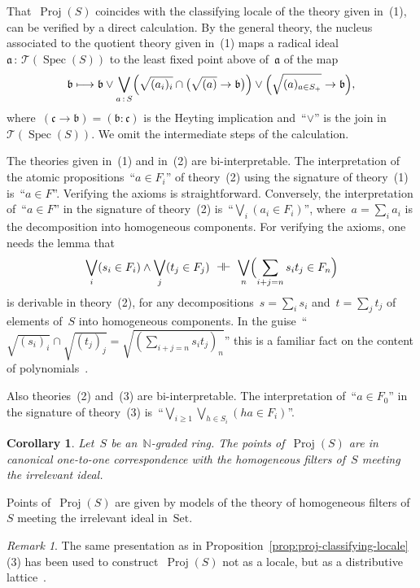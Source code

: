 \documentclass[10pt,reqno,a4paper]{amsbook}
\makeatletter
\theoremstyle{definition}
\theoremstyle{plain}
\newtheorem{cor}[defn]{Corollary}
\theoremstyle{remark}
\newtheorem{rem}[defn]{Remark}
\newcommand{\T}{\mathcal{T}}
\newcommand{\NN}{\mathbb{N}}
\newcommand{\aaa}{\mathfrak{a}}
\newcommand{\bbb}{\mathfrak{b}}
\newcommand{\ccc}{\mathfrak{c}}
\newcommand{\Set}{\mathrm{Set}}
\DeclareMathOperator{\Spec}{Spec}
\DeclareMathOperator{\Proj}{Proj}
\newcommand{\Open}{\T}
\newcommand{\?}{\,{:}\,}
\renewcommand{\_}{\mathpunct{.}\,}
\renewenvironment{proof}[1][\proofname]{\par
  \pushQED{\qed}%
  \normalfont \topsep6\p@\@plus6\p@\relax
  \trivlist
  \item[\hskip\labelsep
        \itshape
    #1\@addpunct{.}]\ignorespaces
}{%
  \popQED\endtrivlist\@endpefalse
}
\makeatother
\begin{document}
\begin{proof}That~$\Proj(S)$ coincides with the classifying locale of the
theory given in~(1), can be verified by a direct calculation. By the general
theory, the nucleus associated to the quotient theory given in~(1) maps a
radical ideal~$\aaa \? \Open(\Spec(S))$ to the least fixed point above
of~$\aaa$ of the map
\[ \bbb \longmapsto
  \bbb \vee
  \bigvee_{a \? S} \Bigl(\sqrt{(a_i)_i} \cap \bigl(\sqrt{(a)} \rightarrow \bbb\bigr)\Bigr) \vee
  \Bigl(\sqrt{(a)_{a \in S_+}} \to \bbb\Bigr), \]
where~$(\ccc \to \bbb) = (\bbb : \ccc)$ is the Heyting implication
and~``$\vee$'' is the join in~$\Open(\Spec(S))$. We omit the intermediate steps
of the calculation.

The theories given in~(1) and in~(2) are bi-interpretable. The interpretation
of the atomic propositions~``$a \in F_i$'' of theory~(2) using the signature of
theory~(1) is~``$a \in F$''. Verifying the axioms is straightforward.
Conversely, the interpretation of~``$a \in F$'' in the signature of theory~(2)
is~``$\bigvee_i (a_i \in F_i)$'', where~$a = \sum_i a_i$ is the decomposition
into homogeneous components. For verifying the axioms, one needs the lemma that
\[ \bigvee_i (s_i \in F_i)  \wedge  \bigvee_j (t_j \in F_j)
    \ \dashv\vdash\ \bigvee_n \Bigl(\sum_{i+j=n} s_i t_j \in F_n\Bigr) \]
is derivable in theory~(2), for any decompositions~$s = \sum_i s_i$ and~$t =
\sum_j t_j$ of elements of~$S$ into homogeneous components. In the
guise~``$\sqrt{(s_i)_i} \cap \sqrt{(t_j)_j} = \sqrt{(\sum_{i+j=n} s_i t_j)_n}$''
this is a familiar fact on the content of
polynomials~\cite[Proposition~1]{banaschewski:vermeulen:radical-content}.

Also theories~(2) and~(3) are bi-interpretable. The interpretation of~``$a \in
F_0$'' in the signature of theory~(3) is~``$\bigvee_{i \geq 1} \bigvee_{h \in
S_i} (ha \in F_i)$''.
\end{proof}

\begin{cor}Let~$S$ be an~$\NN$-graded ring. The points of~$\Proj(S)$ are in
canonical one-to-one correspondence with the homogeneous filters
of~$S$ meeting the irrelevant ideal.\end{cor}

\begin{proof}Points of~$\Proj(S)$ are given by models of the theory of
homogeneous filters of~$S$ meeting the irrelevant ideal in~$\Set$.
\end{proof}

\begin{rem}The same presentation as in
Proposition~\ref{prop:proj-classifying-locale}(3) has been used to
construct~$\Proj(S)$ not as a locale, but as a distributive
lattice~\cite{cls:projective-spectrum}.\end{rem}
\end{document}
